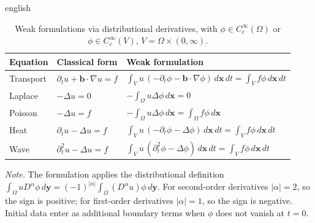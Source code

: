 \documentclass[12pt,letterpaper,twoside]{book}
\newcommand{\abs}[1]{\left\lvert #1 \right\rvert}
\begin{document}
\begin{hyphenrules}{english}
\begin{table}[htbp]
  \centering
  \caption[Weak formulations via distributional derivatives]{Weak formulations via distributional derivatives, with
  $\phi\in C_c^\infty(\Omega)$ or $\phi\in C_c^\infty(V)$, $V=\Omega\times(0,\infty)$.}
  \label{tab:weak-forms}
  \small
  \begin{tabular}{@{}lll@{}}
    \toprule
    Equation & Classical form & Weak formulation \\
    \midrule
    Transport & $\partial_t u+\mathbf{b}\cdot\nabla u=f$ & $\displaystyle\int_V u\,(-\partial_t\phi-\mathbf{b}\cdot\nabla\phi)\,d\mathbf{x}\,d t=\int_V f\phi\,d\mathbf{x}\,d t$ \\[3mm]
    Laplace   & $-\Delta u=0$ & $\displaystyle-\int_\Omega u\Delta\phi\,d\mathbf{x}=0$ \\[3mm]
    Poisson   & $-\Delta u=f$ & $\displaystyle-\int_\Omega u\Delta\phi\,d\mathbf{x}=\int_\Omega f\phi\,d\mathbf{x}$ \\[3mm]
    Heat      & $\partial_t u-\Delta u=f$ & $\displaystyle\int_V u\,(-\partial_t\phi-\Delta\phi)\,d\mathbf{x}\,d t=\int_V f\phi\,d\mathbf{x}\,d t$ \\[3mm]
    Wave      & $\partial_t^2u-\Delta u=f$ & $\displaystyle\int_V u\,(\partial_t^2\phi-\Delta\phi)\,d\mathbf{x}\,d t=\int_V f\phi\,d\mathbf{x}\,d t$ \\
    \bottomrule
  \end{tabular}
  \par\smallskip
  \parbox{0.92\linewidth}{\footnotesize\emph{Note.} The formulation applies the distributional definition
  $\int_\Omega uD^\alpha\phi\,d\mathbf{y}=(-1)^{\abs{\alpha}}\int_\Omega(D^\alpha u)\phi\,d\mathbf{y}$. For second-order
  derivatives $\abs{\alpha}=2$, so the sign is positive; for first-order derivatives $\abs{\alpha}=1$, so
  the sign is negative. Initial data enter as additional boundary terms when $\phi$ does not vanish at
  $t=0$.}
\end{table}


\end{hyphenrules}
\end{document}
